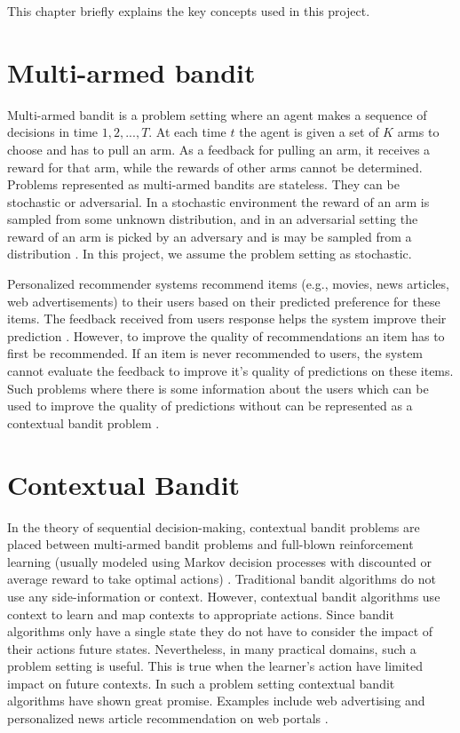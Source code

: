 \label{Preliminaries}

This chapter briefly explains the key concepts used in this project.

\section{Multi-armed bandit \label{chap2:bandits}}

Multi-armed bandit is a problem setting where an agent makes a sequence of decisions in time $1, 2, ..., T$. At each time $t$ the agent is given a set of $K$ arms to choose and has to pull an arm. As a feedback for pulling an arm, it receives a reward for that arm, while the rewards of other arms cannot be determined. Problems represented as multi-armed bandits are stateless. They can be stochastic or adversarial. In a stochastic environment the reward of an arm is sampled from some unknown distribution, and in an adversarial setting the reward of an arm is picked by an adversary and is may be sampled from a distribution \cite{zhou2015survey}. In this project, we assume the problem setting as stochastic. \par

Personalized recommender systems recommend items (e.g., movies, news articles, web advertisements) to their users based on their predicted preference for these items. The feedback received from users response helps the system improve their prediction \cite{adomavicius2005toward}. However, to improve the quality of recommendations an item has to first be recommended. If an item is never recommended to users, the system cannot evaluate the feedback to improve it's quality of predictions on these items. Such problems where there is some information about the users which can be used to improve the quality of predictions without can be represented as a contextual bandit problem  \cite{vermorel2005multi}.

\section{Contextual Bandit \label{chap2:cb}}

In the theory of sequential decision-making, contextual bandit problems \cite{tewari2017ads} are placed between multi-armed bandit problems \cite{bubeck2012regret} and full-blown reinforcement learning (usually modeled using Markov decision processes with discounted or average reward to take optimal actions) \cite{sutton1998introduction}. Traditional bandit algorithms do not use any side-information or context. However, contextual bandit algorithms use context to learn and map contexts to appropriate actions. Since bandit algorithms only have a single state they do not have to consider the impact of their actions future states. Nevertheless, in many practical domains, such a problem setting is useful. This is true when the learner's action have limited impact on future contexts. In such a problem setting contextual bandit algorithms have shown great promise. Examples include web advertising \cite{abe1999learning} and personalized news article recommendation on web portals  \cite{li2010contextual,greenewald2017action}. \par


